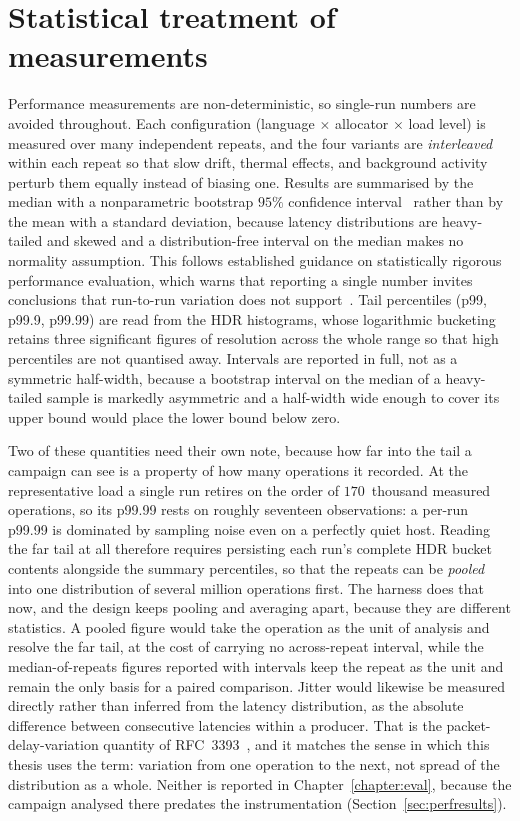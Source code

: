 \documentclass[english,oneside,a4paper,censored,csm,software-track-2020]{HYthesisML}
\begin{document}
\section{Statistical treatment of measurements}\label{sec:stats}
Performance measurements are non-deterministic, so single-run numbers are avoided throughout.
Each configuration (language $\times$ allocator $\times$ load level) is measured over many
independent repeats, and the four variants are \emph{interleaved} within each repeat so that
slow drift, thermal effects, and background activity perturb them equally instead of biasing
one. Results are summarised by the median with a nonparametric bootstrap $95\%$ confidence
interval~\cite{efron1993bootstrap} rather than by the mean with a standard deviation, because
latency distributions are
heavy-tailed and skewed and a distribution-free interval on the median makes no normality
assumption. This follows established guidance on statistically rigorous performance evaluation,
which warns that reporting a single number invites conclusions that run-to-run variation does
not support~\cite{georges2007rigorous}. Tail percentiles (p99, p99.9, p99.99) are read from the
HDR histograms, whose logarithmic bucketing retains three significant figures of resolution
across the whole range so that high percentiles are not quantised away. Intervals are reported
in full, not as a symmetric half-width, because a bootstrap interval on the median of a
heavy-tailed sample is markedly asymmetric and a half-width wide enough to cover its upper
bound would place the lower bound below zero.

Two of these quantities need their own note, because how far into the tail a campaign can see
is a property of how many operations it recorded. At the representative load a single run
retires on the order of $170$~thousand measured operations, so its p99.99 rests on roughly
seventeen observations: a per-run p99.99 is dominated by sampling noise even on a perfectly
quiet host. Reading the far tail at all therefore requires persisting each run's complete HDR
bucket contents alongside the summary percentiles, so that the repeats can be \emph{pooled} into
one distribution of several million operations first. The harness does that now, and the design
keeps pooling and averaging apart, because they are different statistics. A pooled figure would
take the operation as the unit of analysis and resolve the far tail, at the cost of carrying no
across-repeat interval, while the median-of-repeats figures reported with intervals keep the
repeat as the unit and remain the only basis for a paired comparison. Jitter would likewise be
measured directly rather than inferred from the latency distribution, as the absolute difference
between consecutive latencies within a producer. That is the packet-delay-variation quantity of
RFC~3393~\cite{rfc3393}, and it matches the sense in which this thesis uses the term: variation
from one operation to the next, not spread of the distribution as a whole. Neither is reported
in Chapter~\ref{chapter:eval}, because the campaign analysed there predates the instrumentation
(Section~\ref{sec:perfresults}).
\end{document}
